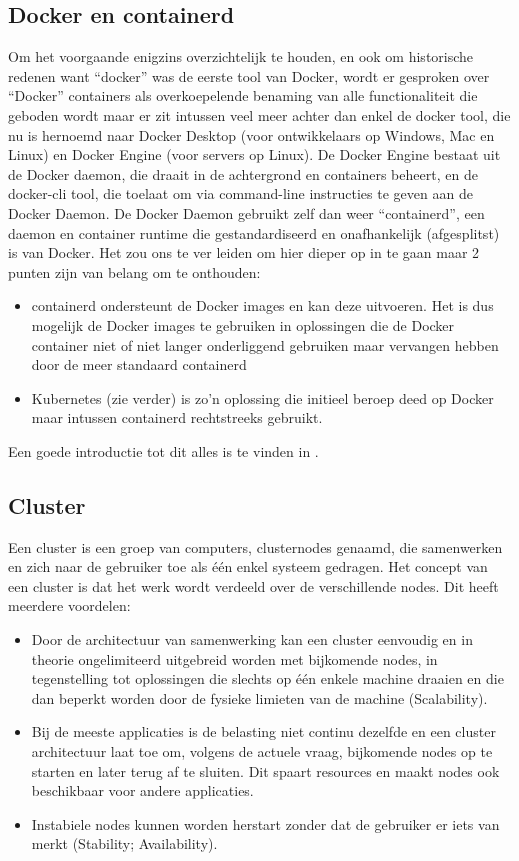 \subsection{Docker en containerd}
Om het voorgaande enigzins overzichtelijk te houden, en ook om historische redenen want ``docker'' was de eerste tool van Docker, wordt er gesproken over ``Docker'' containers als overkoepelende benaming van alle functionaliteit die geboden wordt maar er zit intussen veel meer achter dan enkel de docker tool, die nu is hernoemd naar Docker Desktop (voor ontwikkelaars op Windows, Mac en Linux) en Docker Engine (voor servers op Linux).
De Docker Engine bestaat uit de Docker daemon, die draait in de achtergrond en containers beheert, en de docker-cli tool, die toelaat om via command-line instructies te geven aan de Docker Daemon.
De Docker Daemon gebruikt zelf dan weer ``containerd'', een daemon en container runtime die gestandardiseerd en onafhankelijk (afgesplitst) is van Docker. Het zou ons te ver leiden om hier dieper op in te gaan maar 2 punten zijn van belang om te onthouden:
\begin{itemize}
    \item containerd ondersteunt de Docker images en kan deze uitvoeren. Het is dus mogelijk de Docker images te gebruiken in oplossingen die de Docker container niet of niet langer onderliggend gebruiken maar vervangen hebben door de meer standaard containerd
    \item Kubernetes (zie verder) is zo'n oplossing die initieel beroep deed op Docker maar intussen containerd rechtstreeks gebruikt.
\end{itemize}

Een goede introductie tot dit alles is te vinden in \textcite{Donohue2023}.


\subsection{Cluster}
Een cluster is een groep van computers, clusternodes genaamd, die samenwerken en zich naar de gebruiker toe als \'e\'en enkel systeem gedragen. Het concept van een cluster is dat het werk wordt verdeeld over de verschillende nodes.
Dit heeft meerdere voordelen:
\newline
\begin{itemize}
    \item Door de architectuur van samenwerking kan een cluster eenvoudig en in theorie ongelimiteerd uitgebreid worden met bijkomende nodes, in tegenstelling tot oplossingen die slechts op \'e\'en enkele machine draaien en die dan beperkt worden door de fysieke limieten van de machine (Scalability).
    \item Bij de meeste applicaties is de belasting niet continu dezelfde en een cluster architectuur laat toe om, volgens de actuele vraag, bijkomende nodes op te starten en later terug af te sluiten. Dit spaart resources en maakt nodes ook beschikbaar voor andere applicaties.
    \item Instabiele nodes kunnen worden herstart zonder dat de gebruiker er iets van merkt (Stability; Availability).
\end{itemize}

